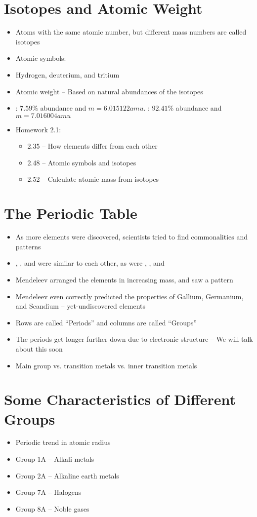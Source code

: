 \documentclass[12pt, openany, letterpaper]{memoir}
\begin{document}
\section{Isotopes and Atomic Weight}
\begin{itemize}
	\item Atoms with the same atomic number, but different mass numbers are called isotopes
	\item Atomic symbols: 
	\item Hydrogen, deuterium, and tritium
	\item Atomic weight -- Based on natural abundances of the isotopes
	\item {}: $7.59\%$ abundance and $m=6.015122amu$. : $92.41\%$ abundance and $m=7.016004amu$
	\item Homework 2.1:
	\begin{itemize}
		\item 2.35 -- How elements differ from each other
		\item 2.48 -- Atomic symbols and isotopes
		\item 2.52 -- Calculate atomic mass from isotopes
	\end{itemize}
\end{itemize}
\section{The Periodic Table}
\begin{itemize}
	\item As more elements were discovered, scientists tried to find commonalities and patterns
	\item {}, , and  were similar to each other, as were , , and 
	\item Mendeleev arranged the elements in increasing mass, and saw a pattern
	\item Mendeleev even correctly predicted the properties of Gallium, Germanium, and Scandium -- yet-undiscovered elements
	\item Rows are called ``Periods'' and columns are called ``Groups''
	\item The periods get longer further down due to electronic structure -- We will talk about this soon
	\item Main group vs. transition metals vs. inner transition metals
\end{itemize}

\section{Some Characteristics of Different Groups}
\begin{itemize}
	\item Periodic trend in atomic radius
	\item Group 1A -- Alkali metals
	\item Group 2A -- Alkaline earth metals
	\item Group 7A -- Halogens
	\item Group 8A -- Noble gases
\end{itemize}
\end{document}
